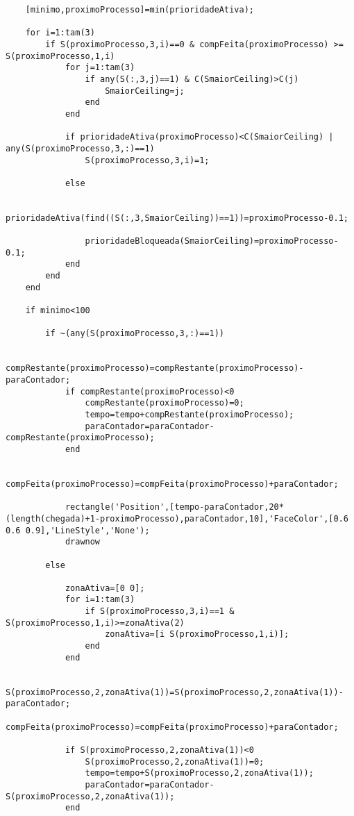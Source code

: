\begin{lstlisting}
    [minimo,proximoProcesso]=min(prioridadeAtiva);
      
    for i=1:tam(3)
        if S(proximoProcesso,3,i)==0 & compFeita(proximoProcesso) >= S(proximoProcesso,1,i)
            for j=1:tam(3)
                if any(S(:,3,j)==1) & C(SmaiorCeiling)>C(j)
                    SmaiorCeiling=j;
                end
            end
            
            if prioridadeAtiva(proximoProcesso)<C(SmaiorCeiling) | any(S(proximoProcesso,3,:)==1)
                S(proximoProcesso,3,i)=1;
                
            else

                prioridadeAtiva(find((S(:,3,SmaiorCeiling))==1))=proximoProcesso-0.1;
                
                prioridadeBloqueada(SmaiorCeiling)=proximoProcesso-0.1;
            end
        end
    end
    
    if minimo<100
        
        if ~(any(S(proximoProcesso,3,:)==1))
        
            compRestante(proximoProcesso)=compRestante(proximoProcesso)-paraContador;
            if compRestante(proximoProcesso)<0
                compRestante(proximoProcesso)=0;
                tempo=tempo+compRestante(proximoProcesso);
                paraContador=paraContador-compRestante(proximoProcesso);
            end
            
            compFeita(proximoProcesso)=compFeita(proximoProcesso)+paraContador;

            rectangle('Position',[tempo-paraContador,20*(length(chegada)+1-proximoProcesso),paraContador,10],'FaceColor',[0.6 0.6 0.9],'LineStyle','None');
            drawnow
            
        else

            zonaAtiva=[0 0];
            for i=1:tam(3)
                if S(proximoProcesso,3,i)==1 & S(proximoProcesso,1,i)>=zonaAtiva(2)
                    zonaAtiva=[i S(proximoProcesso,1,i)];
                end
            end            
            
            S(proximoProcesso,2,zonaAtiva(1))=S(proximoProcesso,2,zonaAtiva(1))-paraContador;
            compFeita(proximoProcesso)=compFeita(proximoProcesso)+paraContador;
            
            if S(proximoProcesso,2,zonaAtiva(1))<0
                S(proximoProcesso,2,zonaAtiva(1))=0;
                tempo=tempo+S(proximoProcesso,2,zonaAtiva(1));
                paraContador=paraContador-S(proximoProcesso,2,zonaAtiva(1));
            end
            

\end{lstlisting}
